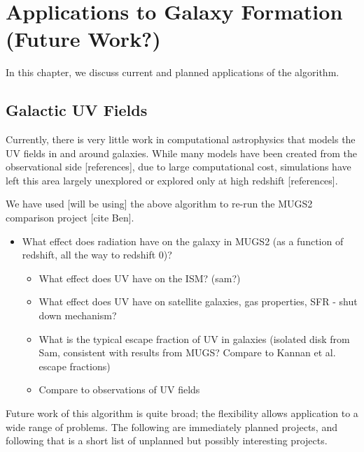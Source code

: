 \pagestyle{fancy}
\headheight 20pt
\chead{}
\lfoot{}
\cfoot{\thepage}
\rfoot{}
\renewcommand{\headrulewidth}{0.1pt}
\renewcommand{\footrulewidth}{0.1pt}

\chapter{Applications to Galaxy Formation (Future Work?)}
\label{chap:galaxyformation}
\thispagestyle{fancy}

In this chapter, we discuss current and planned applications of the algorithm.

\section{Galactic UV Fields}
\label{sec:galacticuvfields}

Currently, there is very little work in computational astrophysics that models the UV fields in and around galaxies. While many models have been created from the observational side [references], due to large computational cost, simulations have left this area largely unexplored or explored only at high redshift [references].

We have used [will be using] the above algorithm to re-run the MUGS2 comparison project [cite Ben].

\begin{itemize}
\item What effect does radiation have on the galaxy in MUGS2 (as a function of redshift, all the way to redshift 0)?
 \begin{itemize}
 \item What effect does UV have on the ISM? (sam?)
 \item What effect does UV have on satellite galaxies, gas properties, SFR - shut down mechanism?
 \item What is the typical escape fraction of UV in galaxies (isolated disk from Sam, consistent with results from MUGS? Compare to Kannan et al. escape fractions)
 \item Compare to observations of UV fields
 \end{itemize}
\end{itemize}

Future work of this algorithm is quite broad; the flexibility allows application to a wide range of problems. The following are immediately planned projects, and following that is a short list of unplanned but possibly interesting projects.

